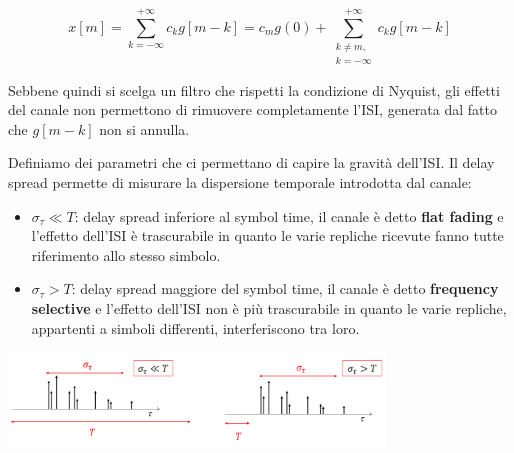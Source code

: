 \[
    x\left[m\right] = \sum_{k=-\infty}^{+\infty} c_k g\left[m - k \right] = c_m g(0) + \sum_{\substack{k \neq m,\\ k=-\infty}}^{+\infty} c_{k} g\left[m-k\right]
\]


Sebbene quindi si scelga un filtro che rispetti la condizione di Nyquist, gli effetti del canale non permettono di rimuovere completamente l'ISI, generata dal fatto che $g\left[m-k\right]$ non si annulla.


Definiamo dei parametri che ci permettano di capire la gravità dell'ISI. Il delay spread permette di misurare la dispersione temporale introdotta dal canale:
\begin{itemize}
    \item $\sigma_\tau \ll T$: delay spread inferiore al symbol time, il canale è detto \textbf{flat fading}  e l'effetto dell'ISI è trascurabile in quanto le varie repliche ricevute fanno tutte riferimento allo stesso simbolo.
    \item $\sigma_\tau > T$: delay spread maggiore del symbol time, il canale è detto \textbf{frequency selective} e l'effetto dell'ISI non è più trascurabile in quanto le varie repliche, appartenti a simboli differenti, interferiscono tra loro.
\end{itemize}

\begin{center}
    \includegraphics[width=0.75\textwidth]{imgs/delay_spread.png}
\end{center}


